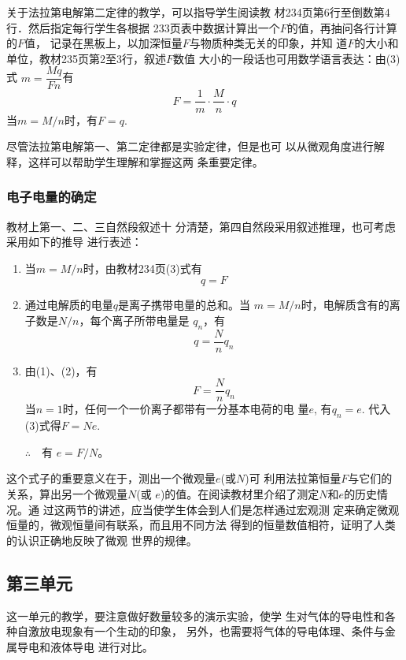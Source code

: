关于法拉第电解第二定律的教学，可以指导学生阅读教
材234页第6行至倒数第4行．然后指定每行学生各根据
233页表中数据计算出一个$F$的值，再抽问各行计算的$F$值，
记录在黑板上，以加深恒量$F$与物质种类无关的印象，并知
道$F$的大小和单位，教材235页第2至3行，叙述$F$数值
大小的一段话也可用数学语言表达：由(3)式
$m=\dfrac{Mq}{Fn}$有
\[F=\frac{1}{m}\cdot \frac{M}{n}\cdot q\]
当$m=M/n$时，有$F=q$.

尽管法拉第电解第一、第二定律都是实验定律，但是也可
以从微观角度进行解释，这样可以帮助学生理解和掌握这两
条重要定律。

\subsubsection{电子电量的确定}

教材上第一、二、三自然段叙述十
分清楚，第四自然段采用叙述推理，也可考虑采用如下的推导
进行表述：
\begin{enumerate}
    \item 当$m=M/n$时，由教材234页(3)式有
    \begin{equation}
        q=F
    \end{equation}

\item 通过电解质的电量$q$是离子携带电量的总和。当
$m=M/n$时，电解质含有的离子数是$N/n$，每个离子所带电量是
$q_n$，有
\begin{equation}
    q=\frac{N}{n}q_n
\end{equation}
\item 由(1)、(2)，有
\begin{equation}
    F=\frac{N}{n}q_n
\end{equation}
当$n=1$时，任何一个一价离子都带有一分基本电荷的电
量$e$, 有$q_n=e$. 代入(3)式得$F=Ne$.

$\therefore\quad $有 $e=F/N$。
\end{enumerate}

这个式子的重要意义在于，测出一个微观量$e$(或$N$)可
利用法拉第恒量$F$与它们的关系，算出另一个微观量$N$(或
$e$)的值。在阅读教材里介绍了测定$N$和$e$的历史情况。通
过这两节的讲述，应当使学生体会到人们是怎样通过宏观测
定来确定微观恒量的，微观恒量间有联系，而且用不同方法
得到的恒量数值相符，证明了人类的认识正确地反映了微观
世界的规律。

\subsection{第三单元}
这一单元的教学，要注意做好数量较多的演示实验，使学
生对气体的导电性和各种自激放电现象有一个生动的印象，
另外，也需要将气体的导电体理、条件与金属导电和液体导电
进行对比。

